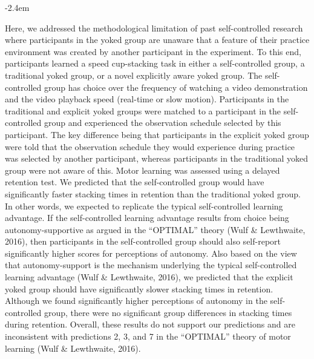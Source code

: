 \documentclass[final]{article}
\renewenvironment{quote}{\begin{fquote}\advance\leftmargini -2.4em\begin{oldquote}}{\end{oldquote}\end{fquote}}
\newenvironment{fquote}
  {\def\FrameCommand{
	\fboxsep=0.6em %
	\fcolorbox{black}{white}}%
    \MakeFramed {\advance\hsize-2\width \FrameRestore}
    \begin{minipage}{\linewidth}
  }
  {\end{minipage}\endMakeFramed}
\begin{document}
\begin{quote}
Here, we addressed the methodological limitation of past self-controlled research where participants in the yoked group are unaware that a feature of their practice environment was created by another participant in the experiment. To this end, participants learned a speed cup-stacking task in either a self-controlled group, a traditional yoked group, or a novel explicitly aware yoked group. The self-controlled group has choice over the frequency of watching a video demonstration and the video playback speed (real-time or slow motion). Participants in the traditional and explicit yoked groups were matched to a participant in the self-controlled group and experienced the observation schedule selected by this participant. The key difference being that participants in the explicit yoked group were told that the observation schedule they would experience during practice was selected by another participant, whereas participants in the traditional yoked group were not aware of this. Motor learning was assessed using a delayed retention test. We predicted that the self-controlled group would have significantly faster stacking times in retention than the traditional yoked group. In other words, we expected to replicate the typical self-controlled learning advantage. If the self-controlled learning advantage results from choice being autonomy-supportive as argued in the ``OPTIMAL'' theory (Wulf \& Lewthwaite, 2016), then participants in the self-controlled group should also self-report significantly higher scores for perceptions of autonomy. Also based on the view that autonomy-support is the mechanism underlying the typical self-controlled learning advantage (Wulf \& Lewthwaite, 2016), we predicted that the explicit yoked group should have significantly slower stacking times in retention. Although we found significantly higher perceptions of autonomy in the self-controlled group, there were no significant group differences in stacking times during retention. Overall, these results do not support our predictions and are inconsistent with predictions 2, 3, and 7 in the ``OPTIMAL'' theory of motor learning (Wulf \& Lewthwaite, 2016).
\end{quote}

\end{document}
